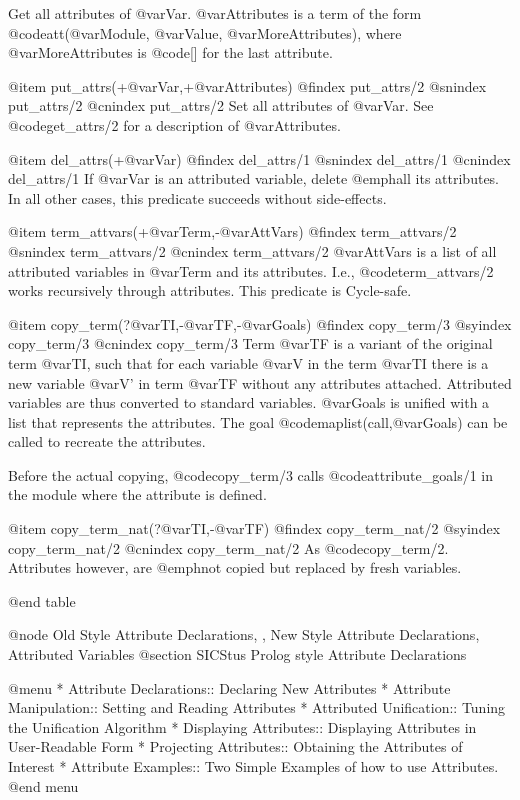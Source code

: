 {{{{{{{{{Get all attributes of @var{Var}. @var{Attributes} is a term of the form
@code{att(@var{Module}, @var{Value}, @var{MoreAttributes})}, where @var{MoreAttributes} is
@code{[]} for the last attribute.

@item put_attrs(+@var{Var},+@var{Attributes})
@findex put_attrs/2
@snindex put_attrs/2
@cnindex put_attrs/2
Set all attributes of @var{Var}.  See @code{get_attrs/2} for a description of
@var{Attributes}.

@item del_attrs(+@var{Var})
@findex del_attrs/1
@snindex del_attrs/1
@cnindex del_attrs/1
If @var{Var} is an attributed variable, delete @emph{all} its
attributes.  In all other cases, this predicate succeeds without
side-effects.

@item term_attvars(+@var{Term},-@var{AttVars})
@findex term_attvars/2
@snindex term_attvars/2
@cnindex term_attvars/2
@var{AttVars} is a list of all attributed variables in @var{Term} and
its attributes. I.e., @code{term_attvars/2} works recursively through
attributes.  This predicate is Cycle-safe.

@item copy_term(?@var{TI},-@var{TF},-@var{Goals}) 
@findex copy_term/3
@syindex copy_term/3
@cnindex copy_term/3
Term @var{TF} is a variant of the original term @var{TI}, such that for
each variable @var{V} in the term @var{TI} there is a new variable @var{V'}
in term @var{TF} without any attributes attached.  Attributed
variables are thus converted to standard variables.  @var{Goals} is
unified with a list that represents the attributes.  The goal
@code{maplist(call,@var{Goals})} can be called to recreate the
attributes.

Before the actual copying, @code{copy_term/3} calls
@code{attribute_goals/1} in the module where the attribute is
defined.

@item copy_term_nat(?@var{TI},-@var{TF}) 
@findex copy_term_nat/2
@syindex copy_term_nat/2
@cnindex copy_term_nat/2
As @code{copy_term/2}.  Attributes however, are @emph{not} copied but replaced
by fresh variables.

@end table

@node Old Style Attribute Declarations, , New Style Attribute Declarations, Attributed Variables
@section SICStus Prolog style Attribute Declarations

@menu
* Attribute Declarations:: Declaring New Attributes
* Attribute Manipulation:: Setting and Reading Attributes
* Attributed Unification:: Tuning the Unification Algorithm
* Displaying Attributes:: Displaying Attributes in User-Readable Form
* Projecting Attributes:: Obtaining the Attributes of Interest
* Attribute Examples:: Two Simple Examples of how to use Attributes.
@end menu

}}}}}}}}}
